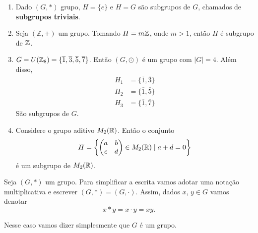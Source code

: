 \begin{exemplos}
	\begin{enumerate}[label={\arabic*})]
		\item Dado $(G,*)$ grupo, $H=\{e\}$ e $H=G$ s{\~a}o subgrupos de $G$, chamados de \textbf{subgrupos triviais}.
		
		\item Seja $(\mathbb{Z},+)$ um grupo. Tomando $H = m\mathbb{Z}$, onde $m > 1$, ent{\~a}o $H$ {\'e} subgrupo de $\mathbb{Z}$.
		
		\item $G = U(\mathbb{Z}_8) = \{\overline{1}, \overline{3}, \overline{5}, \overline{7}\}$. Ent\~ao $(G,\odot)$ {\'e} um grupo com $|G| = 4$. Al\'em disso,
		\begin{align*}
			H_1 &= \{\overline{1}, \overline{3}\}\\
			H_2 &= \{\overline{1}, \overline{5}\}\\
			H_3 &= \{\overline{1}, \overline{7}\}
		\end{align*}
		S\~ao subgrupos de $G$.

		\item Considere o grupo aditivo $M_2(\mathbb{R})$. Então o conjunto
        \[
            H = \left\{\begin{pmatrix}
                a & b\\c & d
            \end{pmatrix} \in M_2(\mathbb{R}) \mid a + d = 0\right\} 
        \]
        \'e um subgrupo de $M_2(\mathbb{R})$.
	\end{enumerate}
\end{exemplos}

Seja $(G, *)$ um grupo. Para simplificar a escrita vamos adotar uma nota\c{c}\~ao multiplicativa e escrever $(G, *) = (G, \cdot)$. Assim, dados $x$, $y \in G$ vamos denotar
\[
    x * y = x \cdot y = xy.
\]

Nesse caso vamos dizer simplesmente que $G$ \'e um grupo.

